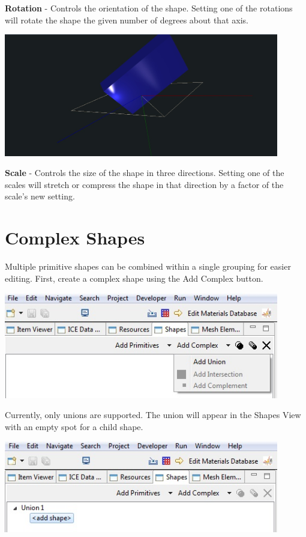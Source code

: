 \documentclass{article}
\begin{document}
\textbf{Rotation} - Controls the orientation of the shape. Setting one of the
rotations will rotate the shape the given number of degrees about that axis.

\begin{center}
\includegraphics[width=12cm]{images/GeometryCubeScale.jpg}
\end{center}

\textbf{Scale} - Controls the size of the shape in three directions. Setting one
of the scales will stretch or compress the shape in that direction by a factor
of the scale's new setting.

\section{Complex Shapes}

Multiple primitive shapes can be combined within a single grouping for easier
editing. First, create a complex shape using the Add Complex button. 

\begin{center}
\includegraphics[width=12cm]{images/GeometryAddComplex.jpg}
\end{center}

Currently, only unions are supported. The union will appear in the Shapes View
with an empty spot for a child shape. 

\begin{center}
\includegraphics[width=12cm]{images/GeometryUnionAddShape.jpg}
\end{center}
\end{document}

